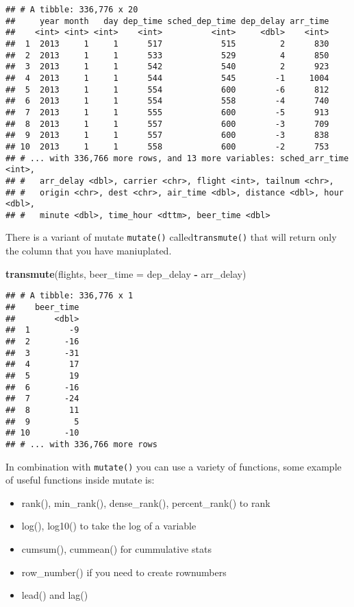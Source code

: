 \documentclass[]{book}
\newenvironment{Shaded}{\begin{snugshade}}{\end{snugshade}}
\newcommand{\DataTypeTok}[1]{\textcolor[rgb]{0.13,0.29,0.53}{#1}}
\newcommand{\KeywordTok}[1]{\textcolor[rgb]{0.13,0.29,0.53}{\textbf{#1}}}
\newcommand{\NormalTok}[1]{#1}
\newcommand{\OperatorTok}[1]{\textcolor[rgb]{0.81,0.36,0.00}{\textbf{#1}}}
\newcommand{\StringTok}[1]{\textcolor[rgb]{0.31,0.60,0.02}{#1}}
\begin{document}
\begin{verbatim}
## # A tibble: 336,776 x 20
##     year month   day dep_time sched_dep_time dep_delay arr_time
##    <int> <int> <int>    <int>          <int>     <dbl>    <int>
##  1  2013     1     1      517            515         2      830
##  2  2013     1     1      533            529         4      850
##  3  2013     1     1      542            540         2      923
##  4  2013     1     1      544            545        -1     1004
##  5  2013     1     1      554            600        -6      812
##  6  2013     1     1      554            558        -4      740
##  7  2013     1     1      555            600        -5      913
##  8  2013     1     1      557            600        -3      709
##  9  2013     1     1      557            600        -3      838
## 10  2013     1     1      558            600        -2      753
## # ... with 336,766 more rows, and 13 more variables: sched_arr_time <int>,
## #   arr_delay <dbl>, carrier <chr>, flight <int>, tailnum <chr>,
## #   origin <chr>, dest <chr>, air_time <dbl>, distance <dbl>, hour <dbl>,
## #   minute <dbl>, time_hour <dttm>, beer_time <dbl>
\end{verbatim}

There is a variant of mutate \texttt{mutate()} called\texttt{transmute()} that will return only the column that you have maniuplated.

\begin{Shaded}
\begin{Highlighting}[]
\KeywordTok{transmute}\NormalTok{(flights, }\DataTypeTok{beer_time =}\NormalTok{ dep_delay }\OperatorTok{-}\StringTok{ }\NormalTok{arr_delay)}
\end{Highlighting}
\end{Shaded}

\begin{verbatim}
## # A tibble: 336,776 x 1
##    beer_time
##        <dbl>
##  1        -9
##  2       -16
##  3       -31
##  4        17
##  5        19
##  6       -16
##  7       -24
##  8        11
##  9         5
## 10       -10
## # ... with 336,766 more rows
\end{verbatim}

In combination with \texttt{mutate()} you can use a variety of functions, some example of useful functions inside mutate is:

\begin{itemize}
\item
  rank(), min\_rank(), dense\_rank(), percent\_rank() to rank
\item
  log(), log10() to take the log of a variable
\item
  cumsum(), cummean() for cummulative stats
\item
  row\_number() if you need to create rownumbers
\item
  lead() and lag()
\end{itemize}
\end{document}
